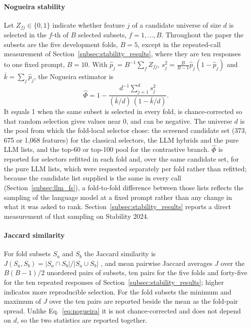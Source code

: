 \documentclass[final,5p,twocolumn]{elsarticle}
\begin{document}
\paragraph{Nogueira stability}
Let $Z_{fj}\in\{0,1\}$ indicate whether feature $j$ of a candidate universe of size $d$ is selected in the $f$-th of $B$ selected subsets, $f=1,\dots,B$. Throughout the paper the subsets are the five development folds, $B=5$, except in the repeated-call measurement of Section~\ref{subsec:stability_results}, where they are ten responses to one fixed prompt, $B=10$. With $\hat p_j=B^{-1}\sum_f Z_{fj}$, $s_j^2=\frac{B}{B-1}\hat p_j(1-\hat p_j)$ and $\bar k=\sum_j \hat p_j$, the Nogueira estimator is \cite{nogueira2018}
\begin{equation}
    \hat\Phi=1-\frac{d^{-1}\sum_{j=1}^{d}s_j^2}{(\bar k/d)\,(1-\bar k/d)} .
    \label{eq:nogueira}
\end{equation}
It equals 1 when the same subset is selected in every fold, is chance-corrected so that random selection gives values near 0, and can be negative. The universe $d$ is the pool from which the fold-local selector chose: the screened candidate set (373, 675 or 1,068 features) for the classical selectors, the LLM hybrids and the pure LLM lists, and the top-60 or top-100 pool for the contrastive branch. $\hat\Phi$ is reported for selectors refitted in each fold and, over the same candidate set, for the pure LLM lists, which were requested separately per fold rather than refitted; because the candidate list supplied is the same in every call (Section~\ref{subsec:llm_fs}), a fold-to-fold difference between those lists reflects the sampling of the language model at a fixed prompt rather than any change in what it was asked to rank. Section~\ref{subsec:stability_results} reports a direct measurement of that sampling on Stability 2024.

\paragraph{Jaccard similarity}
For fold subsets $S_a$ and $S_b$ the Jaccard similarity is $J(S_a,S_b)=|S_a\cap S_b|/|S_a\cup S_b|$ \cite{jaccard1901}, and mean pairwise Jaccard averages $J$ over the $B(B-1)/2$ unordered pairs of subsets, ten pairs for the five folds and forty-five for the ten repeated responses of Section~\ref{subsec:stability_results}; higher indicates more reproducible selection. For the fold subsets the minimum and maximum of $J$ over the ten pairs are reported beside the mean as the fold-pair spread. Unlike Eq.~\eqref{eq:nogueira} it is not chance-corrected and does not depend on $d$, so the two statistics are reported together.
\end{document}
